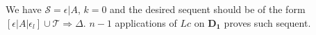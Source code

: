 We have $\mathcal{S} = \epsilon | A$, $k = 0$ and the desired sequent should be of the form $[\epsilon | A | \epsilon_l] \cup \mathcal{T} \Rightarrow \Delta$. $n-1$ applications of $Lc$ on $\mathbf{D_1}$ proves such sequent.